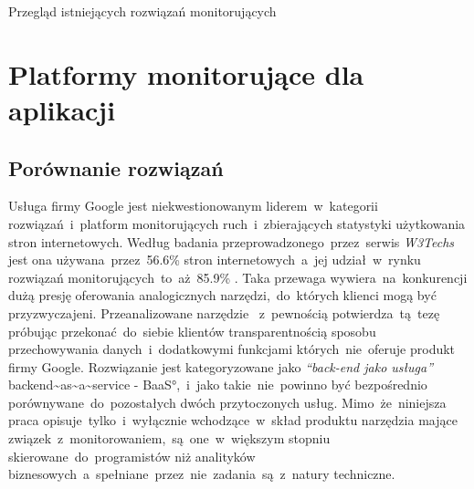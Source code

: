 \begin{chapter}{Przegląd istniejących rozwiązań monitorujących}
	\label{cha:existing_solutions}
	\newcommand{\chapterPath}{chapters/Existing_solutions}

	

	\section{Platformy monitorujące dla aplikacji} 
	
	
	
	
	\subsection{Porównanie rozwiązań}
	Usługa firmy Google jest niekwestionowanym liderem~w~kategorii rozwiązań~i~platform monitorujących ruch~i~zbierających statystyki użytkowania stron internetowych. Według badania przeprowadzonego~przez~serwis {\it W3Techs} jest ona używana~przez~56.6\% stron internetowych~a~jej udział~w~rynku rozwiązań monitorujących~to~aż~85.9\% \cite{Analytics_Stats}. Taka przewaga wywiera~na~konkurencji dużą presję oferowania analogicznych narzędzi,~do~których klienci mogą być przyzwyczajeni. Przeanalizowane narzędzie ~z~pewnością potwierdza~tą~tezę próbując przekonać~do~siebie klientów transparentnością sposobu przechowywania danych~i~dodatkowymi funkcjami których~nie~oferuje produkt firmy Google. Rozwiązanie  jest kategoryzowane jako {\it ``back-end jako usługa''} \ang{backend~as~a~service - BaaS},~i~jako takie~nie~powinno być bezpośrednio porównywane~do~pozostałych dwóch przytoczonych usług. Mimo~że~niniejsza praca opisuje~tylko~i~wyłącznie wchodzące~w~skład produktu  narzędzia mające związek~z~monitorowaniem,~są~one~w~większym stopniu skierowane~do~programistów niż analityków biznesowych~a~spełniane~przez~nie~zadania~są~z~natury techniczne.
	
	
	

\end{chapter}
